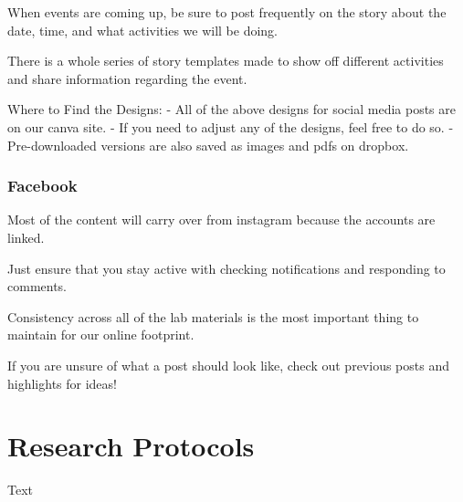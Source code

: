 \documentclass[]{book}
\begin{document}
When events are coming up, be sure to post frequently on the story about the date, time, and what activities we will be doing.

There is a whole series of story templates made to show off different activities and share information regarding the event.

Where to Find the Designs:
- All of the above designs for social media posts are on our canva site.
- If you need to adjust any of the designs, feel free to do so.
- Pre-downloaded versions are also saved as images and pdfs on dropbox.

\hypertarget{facebook}{%
\subsection{Facebook}\label{facebook}}

Most of the content will carry over from instagram because the accounts are linked.

Just ensure that you stay active with checking notifications and responding to comments.

Consistency across all of the lab materials is the most important thing to maintain for our online footprint.

If you are unsure of what a post should look like, check out previous posts and highlights for ideas!

\hypertarget{research-protocols}{%
\chapter{Research Protocols}\label{research-protocols}}

Text


\end{document}
